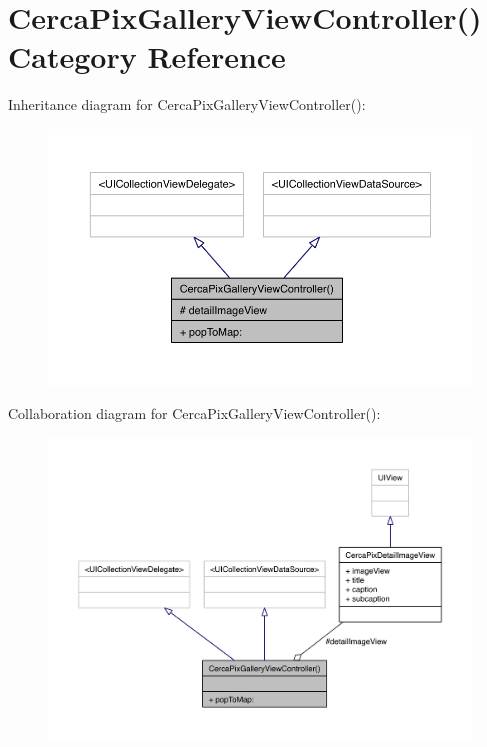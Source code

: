 \hypertarget{category_cerca_pix_gallery_view_controller_07_08}{\section{Cerca\-Pix\-Gallery\-View\-Controller() Category Reference}
\label{category_cerca_pix_gallery_view_controller_07_08}
}


Inheritance diagram for Cerca\-Pix\-Gallery\-View\-Controller()\-:\nopagebreak
\begin{figure}[H]
\begin{center}
\leavevmode
\includegraphics[width=350pt]{category_cerca_pix_gallery_view_controller_07_08__inherit__graph}
\end{center}
\end{figure}


Collaboration diagram for Cerca\-Pix\-Gallery\-View\-Controller()\-:\nopagebreak
\begin{figure}[H]
\begin{center}
\leavevmode
\includegraphics[width=350pt]{category_cerca_pix_gallery_view_controller_07_08__coll__graph}
\end{center}
\end{figure}
